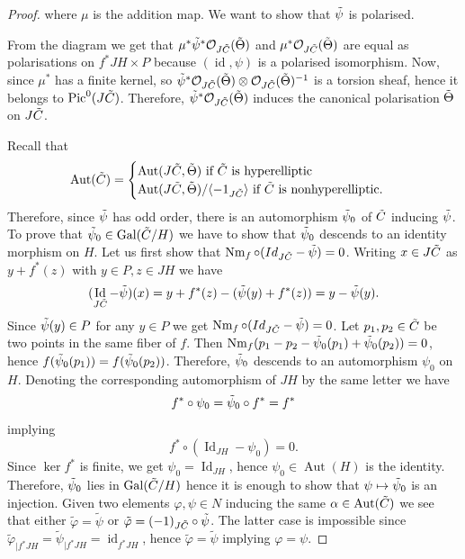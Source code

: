 \documentclass{amsart}
\theoremstyle{remark}
\numberwithin{equation}{section}
\newcommand{\tC}{\Tilde{C}}
\DeclareMathOperator{\Aut}{Aut}
\DeclareMathOperator{\Gal}{Gal}
\DeclareMathOperator{\id}{id}
\DeclareMathOperator{\Id}{Id}
\DeclareMathOperator{\Nm}{Nm}
\DeclareMathOperator{\Pic}{Pic}
\begin{document}
\begin{proof}
where $\mu$ is the addition map. We want to show that $\Tilde{\psi}$ is polarised.

From the diagram we get that $\mu^*\Tilde{\psi}^*\mathcal{O}_{J\tC}(\Tilde{\Theta})$ and $ \mu^*\mathcal{O}_{J\tC}(\Tilde{\Theta})$ are equal as polarisations on $f^*JH \times P$ because $(\id,\psi)$ is a polarised isomorphism.
Now, since $\mu^*$ has a finite kernel, so  
$\Tilde{\psi}^*\mathcal{O}_{J\tC}(\Tilde{\Theta}) \otimes \mathcal{O}_{J\tC}(\Tilde{\Theta})^{-1}$ is a torsion sheaf, hence it belongs to $\Pic^0(J\tC)$. 
Therefore, $\Tilde{\psi}^*\mathcal{O}_{J\tC}(\Tilde{\Theta})$ induces the canonical polarisation $\Tilde{\Theta}$ on $J\tC$. 

Recall that \cite[Exercise 11.19]{BL} $$\Aut(\tC) = \begin{cases} \Aut(J\tC, \tilde{\Theta})  \text{ if } \tC \text{ is hyperelliptic} \\  \Aut(J\tC, \tilde{\Theta})/ \langle -1_{J\tC} \rangle \text{ if } \tC \text{ is nonhyperelliptic.} \end{cases}$$ Therefore, since $\Tilde{\psi}$ has odd order, there is an automorphism $\Tilde{\psi}_0$ of $\tC$ inducing $\Tilde{\psi}$. To prove that $\Tilde{\psi}_0 \in \Gal(\tC/H)$ we have to show that $\Tilde{\psi}_0$ descends to an identity morphism on $H$. Let us first show that $\Nm_f \circ (Id_{J\tC} - \Tilde{\psi}) = 0$. Writing $x \in J\tC$ as $y + f^*(z)$ with $y \in P, z \in JH$ we have $$(\Id_{J\tC} - \Tilde{\psi})(x) = y + f^*(z) - (\Tilde{\psi}(y) + f^*(z)) = y - \Tilde{\psi}(y).$$ Since $\Tilde{\psi}(y) \in P$ for any $y \in P$ we get $\Nm_f \circ (Id_{J\tC} - \Tilde{\psi}) = 0$. Let $p_1,p_2 \in \tC$ be two points in the same fiber of $f$. Then
$\Nm_f(p_1 - p_2 - \Tilde{\psi}_0(p_1) + \Tilde{\psi}_0(p_2)) = 0$, hence $f(\Tilde{\psi}_0(p_1)) = f(\Tilde{\psi}_0(p_2))$. Therefore, $\Tilde{\psi}_0$ descends to an automorphism $\psi_0$ on $H$. Denoting the corresponding automorphism of $JH$ by the same letter we have $$f^* \circ \psi_0 = \Tilde{\psi}_0 \circ f^* = f^*$$ implying $$f^*\circ (\Id_{JH} - \psi_0) = 0.$$ Since $\ker f^*$ is finite, we get $\psi_0 = \Id_{JH}$, hence $\psi_0 \in \Aut(H)$ is the identity. Therefore, $\Tilde{\psi}_0$ lies in $\Gal(\tC/H)$ hence it is enough to show that $\psi \mapsto \Tilde{\psi}_0$ is an injection. Given two elements $\varphi, \psi \in N$ inducing the same $\alpha \in \Aut(\tC)$ we see that either $\tilde{\varphi} = \tilde{\psi}$ or $\tilde{\varphi} =  (-1)_{J\tC}\circ \tilde{\psi}$. The latter case is impossible since $\tilde{\varphi}_{|f^*JH} = \tilde{\psi}_{|f^*JH} = \id_{f^*JH}$, hence $\tilde{\varphi} = \tilde{\psi}$ implying $\varphi = \psi$. 
\end{proof} 
\end{document}
